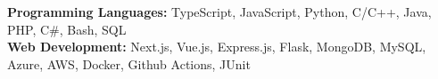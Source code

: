 \vspace{5pt}\item{
    \textbf{Programming Languages:} 
    TypeScript,
    JavaScript,
    Python,
    C/C++,
    Java,
    PHP,
    C\#,
    Bash,
    SQL \\
    
    \textbf{Web Development:} 
    Next.js,
    Vue.js,
    Express.js,
    Flask,
    MongoDB,
    MySQL,
    Azure,
    AWS,
    Docker,
    Github Actions,
    JUnit \\
}
